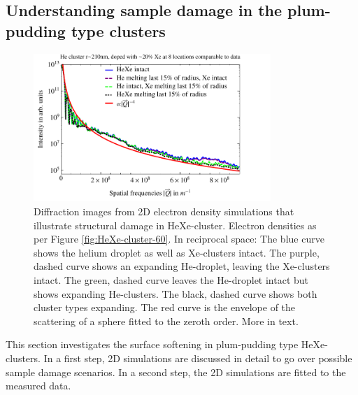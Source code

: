 \subsection{Understanding sample damage in the plum-pudding type clusters}\label{sec:helium-xenon-data}
\begin{figure}
	\centering
		\includegraphics[width=0.8\textwidth]{images/results/simulations-damage-explain2.pdf}
	\caption[Simulated structural damage scenarios in HeXe-clusters.]{Diffraction images from 2D electron density simulations that illustrate structural damage in HeXe-cluster. Electron densities as per Figure \ref{fig:HeXe-cluster-60}. In reciprocal space: The blue curve shows the helium droplet as well as Xe-clusters intact. The purple, dashed curve shows an expanding He-droplet, leaving the Xe-clusters intact. The green, dashed curve leaves the He-droplet intact but shows expanding He-clusters. The black, dashed curve shows both cluster types expanding. The red curve is the envelope of the scattering of a sphere fitted to the zeroth order. More in text.}
	\label{fig:simulations-damage-explain}
\end{figure}
%
This section investigates the surface softening in plum-pudding type HeXe-clusters. In a first step, 2D simulations are discussed in detail to go over possible sample damage scenarios. In a second step, the 2D simulations are fitted to the measured data.
